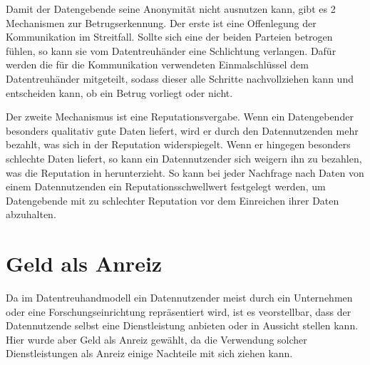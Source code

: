 \documentclass{scrreprt}
\begin{document}
Damit der Datengebende seine Anonymität nicht ausnutzen kann, gibt es 2 Mechanismen zur Betrugserkennung. Der erste ist eine Offenlegung der Kommunikation im Streitfall. Sollte sich eine der beiden Parteien betrogen fühlen, so kann sie vom Datentreuhänder eine Schlichtung verlangen. Dafür werden die für die Kommunikation verwendeten Einmalschlüssel dem Datentreuhänder mitgeteilt, sodass dieser alle Schritte nachvollziehen kann und entscheiden kann, ob ein Betrug vorliegt oder nicht. 

Der zweite Mechanismus ist eine Reputationsvergabe. Wenn ein Datengebender besonders qualitativ gute Daten liefert, wird er durch den Datennutzenden mehr bezahlt, was sich in der Reputation widerspiegelt. Wenn er hingegen besonders schlechte Daten liefert, so kann ein Datennutzender sich weigern ihn zu bezahlen, was die Reputation in herunterzieht. So kann bei jeder Nachfrage nach Daten von einem Datennutzenden ein Reputationsschwellwert festgelegt werden, um Datengebende mit zu schlechter Reputation vor dem Einreichen ihrer Daten abzuhalten. 

\section{Geld als Anreiz}
Da im Datentreuhandmodell ein Datennutzender meist durch ein Unternehmen oder eine Forschungseinrichtung repräsentiert wird, ist es veorstellbar, dass der Datennutzende selbst eine Dienstleistung anbieten oder in Aussicht stellen kann. Hier wurde aber Geld als Anreiz gewählt, da die Verwendung solcher Dienstleistungen als Anreiz einige Nachteile mit sich ziehen kann.
\end{document}
